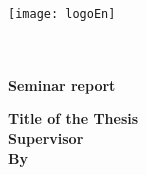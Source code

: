 \thispagestyle{empty}
\begin{center}
	\begin{latin}
		\texttt{[image: logoEn]} \\
		\begin{Large}
			\textbf{\enlevel} \\ 
		\textbf{\enDep}\\[2cm]
		\textbf{Seminar report} \\ [6mm]
				\end{Large}
		\vskip 1cm
		\Large\textbf{Title of the Thesis}      \vspace{0.3cm}\\ \textbf{\huge{\entitle}}
		\vskip 1.5cm
\Large\textbf{Supervisor} \\ \large{\ensupervisor}
		\vskip 1.5cm
		\vskip 1.5cm
			\Large\textbf{By}         \\ \large{\enAuthor}
		\vskip 1.5cm
				\large\textbf{\engdate}
	\end{latin}
\end{center}